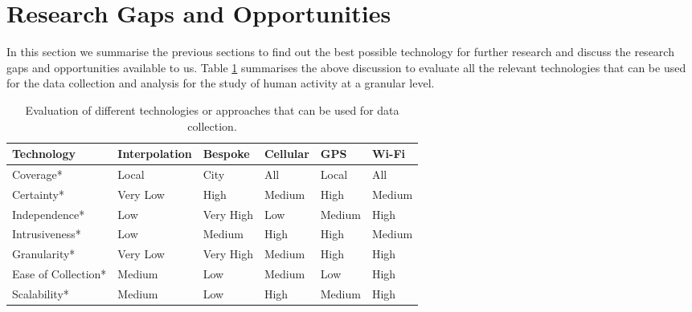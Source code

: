 \section{Research Gaps and Opportunities}

In this section we summarise the previous sections to find out the best possible  technology for further research and discuss the research gaps and opportunities available to us.
Table \ref{table:literature:technologies} summarises the above discussion to evaluate all the relevant technologies that can be used for the data collection and analysis for the study of human activity at a granular level.

\begin{table}
  \footnotesize
  \begin{center}
    \begin{tabular}{p{2.25cm}p{1.5cm}p{1.3cm}p{1.3cm}p{1.3cm}p{1.3cm}}
      \toprule
        Technology & Interpolation & Bespoke & Cellular & GPS & Wi-Fi \\
      \midrule
        Coverage* & Local & City & All & Local & All\\
        \addlinespace[0.2cm]
        Certainty* & Very Low & High & Medium & High & Medium \\
        \addlinespace[0.2cm]
        Independence* & Low & Very High & Low & Medium & High \\
        \addlinespace[0.2cm]
        Intrusiveness* & Low & Medium & High & High & Medium \\
        \addlinespace[0.2cm]
        Granularity* & Very Low & Very High & Medium & High & High \\
        \addlinespace[0.2cm]
        Ease of Collection* & Medium & Low & Medium & Low & High \\
        \addlinespace[0.2cm]
        Scalability* & Medium & Low & High & Medium & High \\
      \bottomrule
    \end{tabular}
  \end{center}
  \caption{Evaluation of different technologies or approaches that can be used for data collection.}
  \label{table:literature:technologies}
\end{table}

